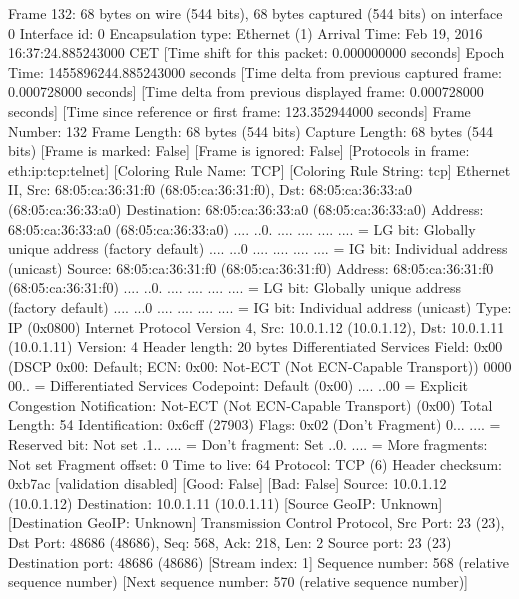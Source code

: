 Frame 132: 68 bytes on wire (544 bits), 68 bytes captured (544 bits) on interface 0
    Interface id: 0
    Encapsulation type: Ethernet (1)
    Arrival Time: Feb 19, 2016 16:37:24.885243000 CET
    [Time shift for this packet: 0.000000000 seconds]
    Epoch Time: 1455896244.885243000 seconds
    [Time delta from previous captured frame: 0.000728000 seconds]
    [Time delta from previous displayed frame: 0.000728000 seconds]
    [Time since reference or first frame: 123.352944000 seconds]
    Frame Number: 132
    Frame Length: 68 bytes (544 bits)
    Capture Length: 68 bytes (544 bits)
    [Frame is marked: False]
    [Frame is ignored: False]
    [Protocols in frame: eth:ip:tcp:telnet]
    [Coloring Rule Name: TCP]
    [Coloring Rule String: tcp]
Ethernet II, Src: 68:05:ca:36:31:f0 (68:05:ca:36:31:f0), Dst: 68:05:ca:36:33:a0 (68:05:ca:36:33:a0)
    Destination: 68:05:ca:36:33:a0 (68:05:ca:36:33:a0)
        Address: 68:05:ca:36:33:a0 (68:05:ca:36:33:a0)
        .... ..0. .... .... .... .... = LG bit: Globally unique address (factory default)
        .... ...0 .... .... .... .... = IG bit: Individual address (unicast)
    Source: 68:05:ca:36:31:f0 (68:05:ca:36:31:f0)
        Address: 68:05:ca:36:31:f0 (68:05:ca:36:31:f0)
        .... ..0. .... .... .... .... = LG bit: Globally unique address (factory default)
        .... ...0 .... .... .... .... = IG bit: Individual address (unicast)
    Type: IP (0x0800)
Internet Protocol Version 4, Src: 10.0.1.12 (10.0.1.12), Dst: 10.0.1.11 (10.0.1.11)
    Version: 4
    Header length: 20 bytes
    Differentiated Services Field: 0x00 (DSCP 0x00: Default; ECN: 0x00: Not-ECT (Not ECN-Capable Transport))
        0000 00.. = Differentiated Services Codepoint: Default (0x00)
        .... ..00 = Explicit Congestion Notification: Not-ECT (Not ECN-Capable Transport) (0x00)
    Total Length: 54
    Identification: 0x6cff (27903)
    Flags: 0x02 (Don't Fragment)
        0... .... = Reserved bit: Not set
        .1.. .... = Don't fragment: Set
        ..0. .... = More fragments: Not set
    Fragment offset: 0
    Time to live: 64
    Protocol: TCP (6)
    Header checksum: 0xb7ac [validation disabled]
        [Good: False]
        [Bad: False]
    Source: 10.0.1.12 (10.0.1.12)
    Destination: 10.0.1.11 (10.0.1.11)
    [Source GeoIP: Unknown]
    [Destination GeoIP: Unknown]
Transmission Control Protocol, Src Port: 23 (23), Dst Port: 48686 (48686), Seq: 568, Ack: 218, Len: 2
    Source port: 23 (23)
    Destination port: 48686 (48686)
    [Stream index: 1]
    Sequence number: 568    (relative sequence number)
    [Next sequence number: 570    (relative sequence number)]
